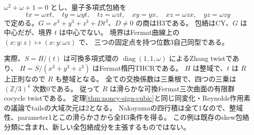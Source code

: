 \begin{example}[位数3の非中央楕円境界は実在する]
\label{ex:normal-elliptic-order3}
$\omega^2+\omega+1=0$ とし、量子多項式包絡を
\[
 tx=\omega xt,\quad ty=\omega yt,\quad tz=\omega zt,\quad
 xy=yx,\quad xz=\omega zx,\quad yz=\omega zy
\]
で定める。$G=x^3+y^3+z^3+Dt^3$、$D\ne0$ の商はH3である。
包絡はCY、$G$ は中心だが、境界 $t$ は中心でない。
境界はFermat曲線上の $(x:y:z)\mapsto(x:y:\omega z)$ で、
三つの固定点を持つ位数3自己同型である。

実際、$S=B/(t)$ は可換多項式環の
$\operatorname{diag}(1,1,\omega)$ によるZhang twistであり、
$H=S/(x^3+y^3+z^3)$ はFermat楕円THCRである。
$H$ は整域で、$t$ は $R$ 上正則なので $R$ も整域となる。
全ての交換係数は三乗根で、四つの三乗は
$(\mathbb Z/3)^4$ 次数0である。
従って $R$ は滑らかな可換Fermat三次曲面の有限群cocycle twistである。
定理\ref{thm:noncy-sign-cubic}と同じ同変化・Reynolds作用素の議論でtailsの大域次元は2となる。
Nakayamaの四行積は全て1なので、整域性、parameter1とこの滑らかさから全H3条件を得る。
この例は既存のskew包絡分類に含まれ、新しい全包絡成分を主張するものではない。
\end{example}
